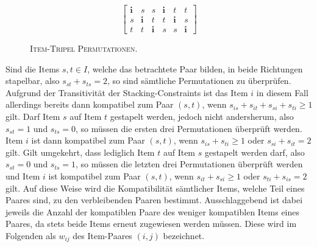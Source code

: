 \vfill
\pagebreak

\begin{figure}[H]
\[
\begin{bmatrix}
  \boldsymbol{i} & s & s & \boldsymbol{i} & t & t \\
  s & \boldsymbol{i} & t & t & \boldsymbol{i} & s \\
  t & t & \boldsymbol{i} & s & s & \boldsymbol{i}
\end{bmatrix}
\]
\caption{\textsc{Item-Tripel Permutationen.}}
\label{fig:triple_permutations}
\end{figure}
Sind die Items $s, t \in I$, welche das betrachtete Paar bilden, in beide Richtungen stapelbar, also
$s_{st} + s_{ts} = 2$, so sind sämtliche Permutationen zu überprüfen.
Aufgrund der Transitivität der Stacking-Constraints ist das Item $i$ in diesem Fall allerdings bereits dann kompatibel zum Paar $(s, t)$,
wenn $s_{is} + s_{it} + s_{si} + s_{ti} \geq 1$ gilt.
Darf Item $s$ auf Item $t$ gestapelt werden, jedoch nicht andersherum, also $s_{st} = 1$ und $s_{ts} = 0$,
so müssen die ersten drei Permutationen überprüft werden. Item $i$ ist dann kompatibel zum Paar $(s, t)$,
wenn $s_{is} + s_{ti} \geq 1$ oder $s_{si} + s_{it} = 2$ gilt.
Gilt umgekehrt, dass lediglich Item $t$ auf Item $s$ gestapelt werden darf, also $s_{st} = 0$ und $s_{ts} = 1$, so
müssen die letzten drei Permutationen überprüft werden und Item $i$ ist kompatibel zum Paar $(s, t)$,
wenn $s_{it} + s_{si} \geq 1$ oder $s_{ti} + s_{is} = 2$ gilt.\newline
Auf diese Weise wird die Kompatibilität sämtlicher Items, welche Teil eines Paares sind, zu den verbleibenden Paaren bestimmt.
Ausschlaggebend ist dabei jeweils die Anzahl der kompatiblen Paare des weniger kompatiblen Items eines Paares,
da stets beide Items erneut zugewiesen werden müssen. Diese wird im Folgenden als 
$w_{ij}$ des Item-Paares $(i, j)$ bezeichnet.

